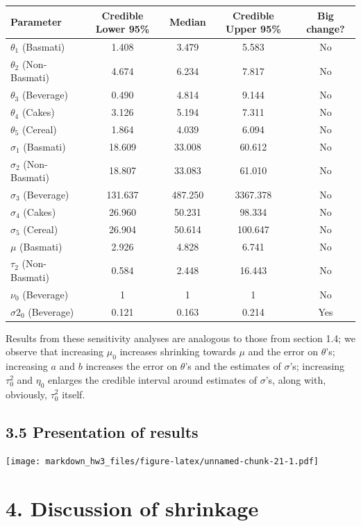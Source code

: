 \documentclass[]{article}
\begin{document}
\begin{center}
  \begin{tabular}{l c c c c}
  \hline Parameter & Credible Lower 95\% & Median & Credible Upper 95\% & Big change? \\ \hline
    $\theta_1$ (Basmati) & 1.408 & 3.479 & 5.583 & No\\ 
    $\theta_2$ (Non-Basmati) & 4.674 & 6.234 & 7.817 & No\\
    $\theta_3$ (Beverage) & 0.490 & 4.814 & 9.144 & No\\
    $\theta_4$ (Cakes) & 3.126 & 5.194 & 7.311 & No \\
    $\theta_5$ (Cereal) & 1.864 & 4.039 & 6.094 & No\\ \hline
    $\sigma_1$ (Basmati) & 18.609 & 33.008 & 60.612 & No \\ 
    $\sigma_2$ (Non-Basmati) & 18.807 & 33.083 & 61.010 & No \\
    $\sigma_3$ (Beverage) &  131.637 & 487.250 & 3367.378 & No \\
    $\sigma_4$ (Cakes) & 26.960 & 50.231 & 98.334 & No \\
    $\sigma_5$ (Cereal) & 26.904 & 50.614 & 100.647 & No \\ \hline
    $\mu$ (Basmati) & 2.926 & 4.828 & 6.741 & No \\ 
    $\tau_2$ (Non-Basmati) & 0.584 & 2.448 & 16.443 & No \\
    $\nu_0$ (Beverage) & 1 & 1 & 1 & No\\
    $\sigma2_0$ (Beverage) & 0.121 & 0.163 & 0.214 & Yes\\ \hline
  \end{tabular}
\end{center}

Results from these sensitivity analyses are analogous to those from
section 1.4; we observe that increasing \(\mu_0\) increases shrinking
towards \(\mu\) and the error on \(\theta\)'s; increasing \(a\) and
\(b\) increases the error on \(\theta\)'s and the estimates of
\(\sigma\)'s; increasing \(\tau^2_0\) and \(\eta_0\) enlarges the
credible interval around estimates of \(\sigma\)'s, along with,
obviously, \(\tau^2_0\) itself.

\subsection{3.5 Presentation of results}

\texttt{[image: markdown\_hw3\_files/figure-latex/unnamed-chunk-21-1.pdf]}
\section{4. Discussion of shrinkage}
\end{document}
